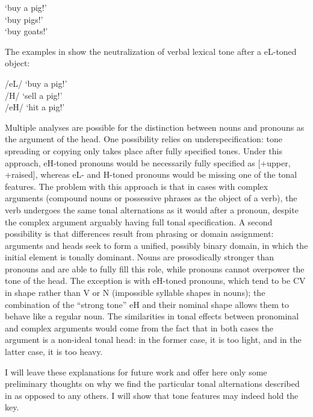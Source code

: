\documentclass[output=paper]{langsci/langscibook}
\begin{document}
\ea\label{ex:mcpherson:20} 
\ea\label{ex:mcpherson:20a} { } `buy a pig!' \\
\ex\label{ex:mcpherson:20b} { } `buy pigs!' \\
\ex\label{ex:mcpherson:20c} { } `buy goats!' \\
\z
\z

The examples in  show the neutralization of verbal lexical tone after a eL-toned object:

\ea\label{ex:mcpherson:21} 
\ea\label{ex:mcpherson:21a} /eL/ { } `buy a pig!' \\
\ex\label{ex:mcpherson:21b} /H/ { } `sell a pig!' \\
\ex\label{ex:mcpherson:21c} /eH/ { } `hit a pig!' \\
\z
\z

Multiple analyses are possible for the distinction between nouns and pronouns as the argument of the head. One possibility relies on underspecification: tone spreading or copying only takes place after fully specified tones. Under this approach, eH-toned pronouns would be necessarily fully specified as [+upper, +raised], whereas eL- and H-toned pronouns would be missing one of the tonal features. The problem with this approach is that in cases with complex arguments (compound nouns or possessive phrases as the object of a verb), the verb undergoes the same tonal alternations as it would after a pronoun, despite the complex argument arguably having full tonal specification. A second possibility is that differences result from phrasing or domain assignment: arguments and heads seek to form a unified, possibly binary domain, in which the initial element is tonally dominant. Nouns are prosodically stronger than pronouns and are able to fully fill this role, while pronouns cannot overpower the tone of the head. The exception is with eH-toned pronouns, which tend to be CV in shape rather than V or N (impossible syllable shapes in nouns); the combination of the ``strong tone'' eH and their nominal shape allows them to behave like a regular noun. The similarities in tonal effects between pronominal and complex arguments would come from the fact that in both cases the argument is a non-ideal tonal head: in the former case, it is too light, and in the latter case, it is too heavy.

I will leave these explanations for future work and offer here only some preliminary thoughts on why we find the particular tonal alternations described in  as opposed to any others. I will show that tone features may indeed hold the key.
\end{document}
